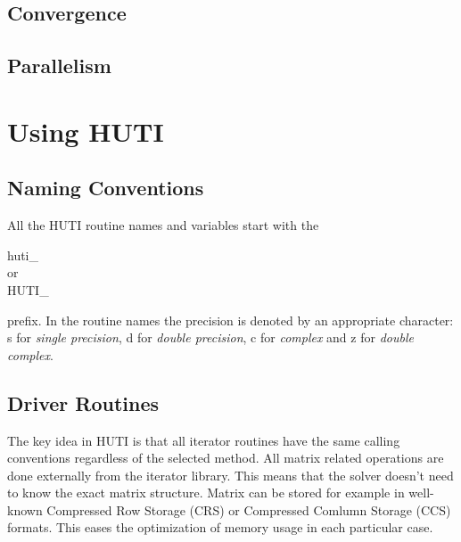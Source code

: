 \documentclass[11pt,a4paper,english,oneside]{report}
\begin{document}
\section{Convergence}
\section{Parallelism}


\chapter{Using HUTI}
\label{ch:using}

\section{Naming Conventions}

All the HUTI routine names and variables start with the 

\begin{minipage}{1in}
\begin{center}
\bigskip
{\ttfamily huti\_} \\
or \\
{\ttfamily HUTI\_}
\bigskip
\end{center}
\end{minipage}

\noindent prefix. In the routine names the precision is denoted by an
appropriate character: {\ttfamily s} for
{\em single precision},
{\ttfamily d} for {\em double precision}, {\ttfamily c} for {\em complex}
and {\ttfamily z} for {\em double complex}.


\section{Driver Routines}

The key idea in HUTI is that all iterator routines have the same calling
conventions regardless of the selected method.
All matrix related operations are done externally from the iterator
library. This means that the solver doesn't need to know the exact matrix
structure. Matrix can be stored for example in well-known Compressed
Row Storage (CRS) or Compressed Comlumn Storage (CCS) formats.
This eases the optimization of memory usage in each particular case.
\end{document}
